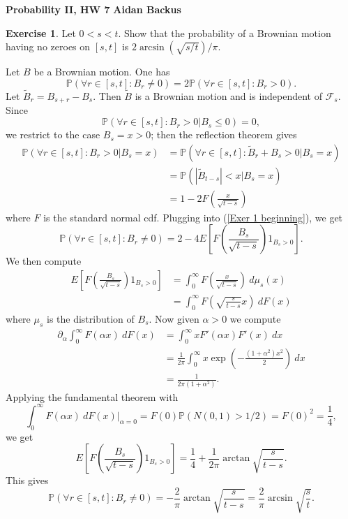 \documentclass[10pt]{article}
\newcommand{\PP}{\mathbb P}
\theoremstyle{definition}
\newtheorem{exer}{Exercise}
\begin{document}
\noindent
\large\textbf{Probability II, HW 7} \hfill \textbf{Aidan Backus} \\

\begin{exer}
Let $0 < s < t$. Show that the probability of a Brownian motion having no zeroes on $[s, t]$ is $2\arcsin(\sqrt{s/t})/\pi$.
\end{exer}

Let $B$ be a Brownian motion. One has
\begin{equation}
\label{Exer 1 beginning}
\PP(\forall r \in [s, t]: B_r \neq 0) = 2\PP(\forall r \in [s, t]: B_r > 0).
\end{equation}
Let $\tilde B_r = B_{s + r} - B_s$.
Then $\tilde B$ is a Brownian motion and is independent of $\mathcal F_s$.
Since
$$\PP(\forall r \in [s, t]: B_r > 0|B_s \leq 0) = 0,$$
we restrict to the case $B_s = x > 0$; then the reflection theorem gives
\begin{align*}
\PP(\forall r \in [s, t]: B_r > 0|B_s = x) &= \PP(\forall r \in [s, t]: \tilde B_r + B_s > 0|B_s = x)\\
&= \PP(|\tilde B_{t - s}| < x|B_s = x)\\
&= 1 - 2F\left(\frac{x}{\sqrt{t - s}}\right)
\end{align*}
where $F$ is the standard normal cdf.
Plugging into (\ref{Exer 1 beginning}), we get
$$\PP(\forall r \in [s, t]: B_r \neq 0) = 2 - 4E\left[F\left(\frac{B_s}{\sqrt{t - s}}\right)1_{B_s > 0}\right].$$
We then compute
\begin{align*}
E\left[F\left(\frac{B_s}{\sqrt{t - s}}\right)1_{B_s > 0}\right] &= \int_0^\infty F\left(\frac{x}{\sqrt{t - s}}\right) ~d\mu_s(x)\\
&= \int_0^\infty F\left(\sqrt{\frac{s}{t - s}}x\right) ~dF(x)
\end{align*}
where $\mu_s$ is the distribution of $B_s$.
Now given $\alpha > 0$ we compute
\begin{align*}
\partial_\alpha \int_0^\infty F(\alpha x) ~dF(x) &= \int_0^\infty x F'(\alpha x) F'(x) ~dx\\
&= \frac{1}{2\pi} \int_0^\infty x\exp\left(-\frac{(1 + \alpha^2)x^2}{2}\right) ~dx\\
&= \frac{1}{2\pi(1 + \alpha^2)}.
\end{align*}
Applying the fundamental theorem with
$$\int_0^\infty F(\alpha x) ~dF(x)\bigg|_{\alpha = 0} = F(0) \PP(N(0, 1) > 1/2) = F(0)^2 = \frac{1}{4},$$
we get
$$E\left[F\left(\frac{B_s}{\sqrt{t - s}}\right)1_{B_s > 0}\right] = \frac{1}{4} + \frac{1}{2\pi} \arctan \sqrt{\frac{s}{t - s}}.$$
This gives
$$\PP(\forall r \in [s, t]: B_r \neq 0) = - \frac{2}{\pi} \arctan \sqrt{\frac{s}{t - s}} = \frac{2}{\pi} \arcsin \sqrt{\frac{s}{t}}.$$
\end{document}
